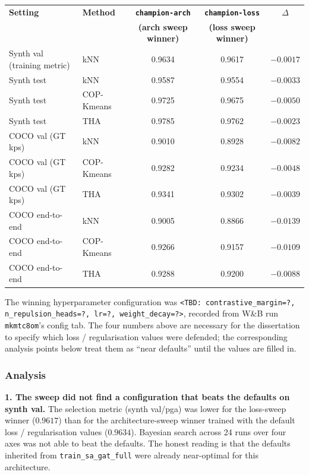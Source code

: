 \begin{tabular}{llccc}
\hline
\textbf{Setting} & \textbf{Method} & \textbf{\texttt{champion-arch}} & \textbf{\texttt{champion-loss}} & \textbf{$\Delta$} \\
                 &                  & \textbf{(arch sweep winner)}    & \textbf{(loss sweep winner)}    &                   \\
\hline
Synth val (training metric) & kNN          & 0.9634          & 0.9617          & $-0.0017$ \\
\hline
Synth test                  & kNN          & 0.9587          & 0.9554          & $-0.0033$ \\
Synth test                  & COP-Kmeans   & 0.9725          & 0.9675          & $-0.0050$ \\
Synth test                  & THA          & 0.9785          & 0.9762          & $-0.0023$ \\
\hline
COCO val (GT kps)           & kNN          & 0.9010          & 0.8928          & $-0.0082$ \\
COCO val (GT kps)           & COP-Kmeans   & 0.9282          & 0.9234          & $-0.0048$ \\
COCO val (GT kps)           & THA          & 0.9341          & 0.9302          & $-0.0039$ \\
\hline
COCO end-to-end             & kNN          & 0.9005          & 0.8866          & $-0.0139$ \\
COCO end-to-end             & COP-Kmeans   & 0.9266          & 0.9157          & $-0.0109$ \\
COCO end-to-end             & THA          & 0.9288          & 0.9200          & $-0.0088$ \\
\hline
\end{tabular}

The winning hyperparameter configuration was \texttt{<TBD: contrastive\_margin=?, n\_repulsion\_heads=?, lr=?, weight\_decay=?>}, recorded from W\&B run \texttt{mkmtc8om}'s config tab.
The four numbers above are necessary for the dissertation to specify which loss / regularisation values were defended; the corresponding analysis points below treat them as ``near defaults'' until the values are filled in.

\subsubsection{Analysis}

\textbf{1. The sweep did not find a configuration that beats the defaults on synth val.} The selection metric (synth val/pga) was lower for the loss-sweep winner ($0.9617$) than for the architecture-sweep winner trained with the default loss / regularisation values ($0.9634$). Bayesian search across 24 runs over four axes was not able to beat the defaults. The honest reading is that the defaults inherited from \texttt{train\_sa\_gat\_full} were already near-optimal for this architecture.

